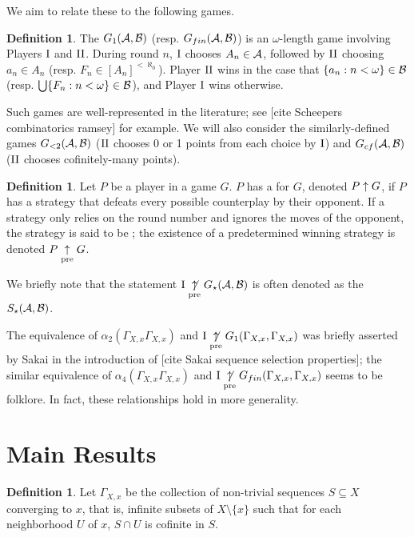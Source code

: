 \documentclass{amsart}
\theoremstyle{plain}
\theoremstyle{definition}
\newtheorem{definition}[theorem]{Definition}
\theoremstyle{remark}
\theoremstyle{plain}
\theoremstyle{definition}
\theoremstyle{remark}
\begin{document}
We aim to relate these to the following games.

\begin{definition}
  The  \(G_1(\mathcal{A},\mathcal{B})\) (resp. \(G_{fin}(\mathcal{A},\mathcal{B})\))
  is an \(\omega\)-length game involving Players \(\mathrm{I}\) and \(\mathrm{II}\). 
  During round \(n\), \(\mathrm{I}\) chooses
  \(A_n\in\mathcal{A}\), followed by \(\mathrm{II}\) choosing \(a_n\in A_n\)
  (resp. \(F_n\in[A_n]^{<\aleph_0}\)).
  Player \(\mathrm{II}\) wins in the case that \(\{a_n:n<\omega\}\in\mathcal{B}\)
  (resp. \(\bigcup\{F_n:n<\omega\}\in\mathcal{B}\)),
  and Player \(\mathrm{I}\) wins otherwise.
\end{definition}

Such games are well-represented in the literature; see [cite Scheepers combinatorics ramsey]
for example.
We will also consider the similarly-defined games \(G_{<2}(\mathcal{A},\mathcal{B})\)
(\(\mathrm{II}\) chooses 0 or 1 points from each choice by \(\mathrm{I}\)) and \(G_{cf}(\mathcal{A},\mathcal{B})\)
(\(\mathrm{II}\) chooses cofinitely-many points).

\begin{definition}
  Let \(P\) be a player in a game \(G\). \(P\) has a 
  for \(G\), denoted \(P\uparrow G\), if \(P\) has a strategy that defeats every
  possible counterplay by their opponent. If a strategy only relies on the
  round number and ignores the moves of the opponent, the strategy is said
  to be ; the existence of a predetermined winning strategy
  is denoted \(P\underset{\text{pre}}{\uparrow} G\).
\end{definition}

We briefly note that the statement \(\mathrm{I}\underset{\text{pre}}{\not\uparrow} G_\star(\mathcal{A},\mathcal{B})\)
is often denoted as the  \(S_\star(\mathcal{A},\mathcal{B})\).

The equivalence of \(\alpha_2(\Gamma_{X,x}\Gamma_{X,x})\) and 
\(\mathrm{I}\underset{\text{pre}}{\not\uparrow} G_1(\Gamma_{X,x},\Gamma_{X,x})\) was briefly asserted by Sakai
in the introduction of [cite Sakai sequence selection properties]; the similar
equivalence of \(\alpha_4(\Gamma_{X,x}\Gamma_{X,x})\) and 
\(\mathrm{I}\underset{\text{pre}}{\not\uparrow} G_{fin}(\Gamma_{X,x},\Gamma_{X,x})\) seems to be folklore.
In fact, these relationships hold in more generality.

\section{Main Results}

\begin{definition}
Let \(\Gamma_{X,x}\) be the collection of non-trivial sequences \(S\subseteq X\) converging to \(x\),
that is, infinite subsets of \(X\setminus\{x\}\) such that for each neighborhood \(U\) of \(x\),
\(S\cap U\) is cofinite in \(S\).
\end{definition}
\end{document}
